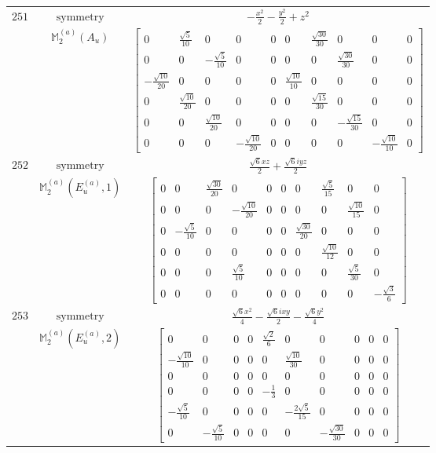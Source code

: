 \documentclass[fleqn,8pt,landscape]{jsarticle}
\begin{document}
\begin{longtable}{ccc}
$ 251 $ & $ \text{symmetry} $ & $ - \frac{x^{2}}{2} - \frac{y^{2}}{2} + z^{2} $ \\
$  $ & $ \mathbb{M}_{2}^{(a)}(A_{u}) $ & $ \begin{bmatrix} 0 & \frac{\sqrt{5}}{10} & 0 & 0 & 0 & 0 & \frac{\sqrt{30}}{30} & 0 & 0 & 0 \\ 0 & 0 & - \frac{\sqrt{5}}{10} & 0 & 0 & 0 & 0 & \frac{\sqrt{30}}{30} & 0 & 0 \\ - \frac{\sqrt{10}}{20} & 0 & 0 & 0 & 0 & \frac{\sqrt{10}}{10} & 0 & 0 & 0 & 0 \\ 0 & \frac{\sqrt{10}}{20} & 0 & 0 & 0 & 0 & \frac{\sqrt{15}}{30} & 0 & 0 & 0 \\ 0 & 0 & \frac{\sqrt{10}}{20} & 0 & 0 & 0 & 0 & - \frac{\sqrt{15}}{30} & 0 & 0 \\ 0 & 0 & 0 & - \frac{\sqrt{10}}{20} & 0 & 0 & 0 & 0 & - \frac{\sqrt{10}}{10} & 0 \end{bmatrix} $ \\ \hline
$ 252 $ & $ \text{symmetry} $ & $ \frac{\sqrt{6} x z}{2} + \frac{\sqrt{6} i y z}{2} $ \\
$  $ & $ \mathbb{M}_{2}^{(a)}(E_{u}^{(a)},1) $ & $ \begin{bmatrix} 0 & 0 & \frac{\sqrt{30}}{20} & 0 & 0 & 0 & 0 & \frac{\sqrt{5}}{15} & 0 & 0 \\ 0 & 0 & 0 & - \frac{\sqrt{10}}{20} & 0 & 0 & 0 & 0 & \frac{\sqrt{10}}{15} & 0 \\ 0 & - \frac{\sqrt{5}}{10} & 0 & 0 & 0 & 0 & \frac{\sqrt{30}}{20} & 0 & 0 & 0 \\ 0 & 0 & 0 & 0 & 0 & 0 & 0 & \frac{\sqrt{10}}{12} & 0 & 0 \\ 0 & 0 & 0 & \frac{\sqrt{5}}{10} & 0 & 0 & 0 & 0 & \frac{\sqrt{5}}{30} & 0 \\ 0 & 0 & 0 & 0 & 0 & 0 & 0 & 0 & 0 & - \frac{\sqrt{3}}{6} \end{bmatrix} $ \\ \hline
$ 253 $ & $ \text{symmetry} $ & $ \frac{\sqrt{6} x^{2}}{4} - \frac{\sqrt{6} i x y}{2} - \frac{\sqrt{6} y^{2}}{4} $ \\
$  $ & $ \mathbb{M}_{2}^{(a)}(E_{u}^{(a)},2) $ & $ \begin{bmatrix} 0 & 0 & 0 & 0 & \frac{\sqrt{2}}{6} & 0 & 0 & 0 & 0 & 0 \\ - \frac{\sqrt{10}}{10} & 0 & 0 & 0 & 0 & \frac{\sqrt{10}}{30} & 0 & 0 & 0 & 0 \\ 0 & 0 & 0 & 0 & 0 & 0 & 0 & 0 & 0 & 0 \\ 0 & 0 & 0 & 0 & - \frac{1}{3} & 0 & 0 & 0 & 0 & 0 \\ - \frac{\sqrt{5}}{10} & 0 & 0 & 0 & 0 & - \frac{2 \sqrt{5}}{15} & 0 & 0 & 0 & 0 \\ 0 & - \frac{\sqrt{5}}{10} & 0 & 0 & 0 & 0 & - \frac{\sqrt{30}}{30} & 0 & 0 & 0 \end{bmatrix} $ \\ \hline

\end{longtable}
\end{document}

